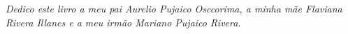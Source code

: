 \cleardoublepage

\null
\vfill
\thispagestyle{empty}



{\normalsize \it \hfill Dedico este livro 
a meu pai Aurelio Pujaico Osccorima, 
a minha mãe Flaviana Rivera Illanes
e a meu irmão Mariano Pujaico Rivera.  \vspace*{4pt}}
